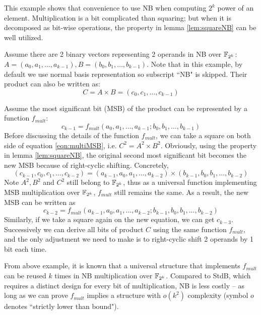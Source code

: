 This example shows that convenience to use NB when computing $2^k$ power of an element.
Multiplication is a bit complicated than squaring; but when it is decomposed as bit-wise
operations, the property in lemma \ref{lem:squareNB} can be well utilized.

\begin{Example}
Assume there are 2 binary vectors representing 2 operands in NB over ${\mathbb{F}}_{2^k}$: 
$A = (a_0, a_1, \dots, a_{k-1}), B = (b_0, b_1, \dots, b_{k-1})$. Note that in this example, 
by default we use normal basis representation so subscript ``NB" is skipped. Their product can also be written
as: $$C = A\times B = (c_0, c_1, \dots, c_{k-1})$$

Assume the most significant bit (MSB) of the product can be represented by a function $f_{mult}$: 
\begin{equation}
\label{eqn:multiMSB}
c_{k-1} = f_{mult}(a_0, a_1, \dots, a_{k-1}; b_0, b_1, \dots, b_{k-1})
\end{equation}
Before discussing the details of the function $f_{mult}$, we can take 
a square on both side of equation \ref{eqn:multiMSB}, i.e. $C^2 = A^2\times B^2$.
Obviously, using the property in lemma \ref{lem:squareNB}, the original second most significant bit 
becomes the new MSB because of right-cyclic shifting. 
Concretely, 
$$(c_{k-1},c_0,c_1,\dots,c_{k-2}) = (a_{k-1},a_0,a_1,\dots,a_{k-2})\times(b_{k-1},b_0,b_1,\dots,b_{k-2})$$
Note $A^2, B^2$ and $C^2$ still belong to ${\mathbb{F}}_{2^k}$, thus as a universal function implementing MSB multiplication
over ${\mathbb{F}}_{2^k}$, $f_{mult}$ still remains the same. As a result, the new MSB can be written as 
\begin{equation}
\label{eqn:shiftMSB}
c_{k-2} = f_{mult}(a_{k-1}, a_0, a_1, 
\dots, a_{k-2}; b_{k-1}, b_0, b_1, \dots, b_{k-2})
\end{equation}
Similarly, if we take a square again on the new equation, we can get $c_{k-3}$.
Successively we can derive all bits of product $C$ using the same function $f_{mult}$, and the only
adjustment we need to make is to right-cyclic shift 2 operands by 1 bit each time.
\end{Example}

From above example, it is known that a universal structure that implements $f_{mult}$ can be reused
$k$ times in NB multiplication over ${\mathbb{F}}_{2^k}$. Compared to StdB, which requires a distinct design 
for every bit of multiplication, NB is less costly -- as long as we can prove $f_{mult}$ implies 
a structure with $o(k^2)$ complexity (symbol $o$ denotes ``strictly lower than bound"). 

